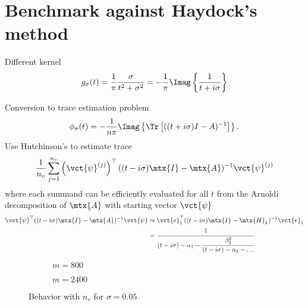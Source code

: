 
\section{Benchmark against Haydock's method}
\label{sec:5-experiments-haydock-method}

Different kernel
\begin{equation}
    g_{\sigma}(t) = \frac{1}{\pi} \frac{\sigma}{t^2 + \sigma^2} = -\frac{1}{\pi} \Imag\left\{ \frac{1}{t + i\sigma} \right\}
    \label{equ:5-experiments-cauchy-kernel}
\end{equation}

Conversion to trace estimation problem
\begin{equation}
    \phi_{\sigma}(t) = - \frac{1}{n \pi} \Imag \left\{ \Tr\left[((t + i\sigma)I - A)^{-1}\right]  \right\}.
    \label{equ:5-experiments-haydock-trace}
\end{equation}
Use Hutchinson's to estimate trace
\begin{equation}
    \frac{1}{n_v} \sum_{j=1}^{n_v} \left( \vct{\psi}^{(j)} \right)^{\top} ((t - i\sigma)\mtx{I} - \mtx{A})^{-1} \vct{\psi}^{(j)}
    \label{equ:5-experiments-haydock-hutchinson}
\end{equation}
where each summand can be efficiently evaluated for all $t$ from the Arnoldi decomposition of $\mtx{A}$ with starting vector $\vct{\psi}$
\begin{align}
    \vct{\psi}^{\top} ((t - i\sigma)\mtx{I} - \mtx{A})^{-1} \vct{\psi} &\approx \vct{e}_1^{\top} ((t - i\sigma)\mtx{I} - \mtx{H}_k)^{-1} \vct{e}_1 \notag \\
    &= \cfrac{1}{(t - i\sigma) - \alpha_1 - \cfrac{\beta_2^2}{(t - i\sigma) - \alpha_2 - \dots}}
    \label{equ:5-experiments-haydock-recursion}
\end{align}

\clearpage
\begin{figure}[ht]
    \begin{subfigure}[b]{0.45\columnwidth}
        
        \caption{$m=800$}
        \label{fig:5-experiments-haydock-convergence-nv-m800}
    \end{subfigure}
    \begin{subfigure}[b]{0.5\columnwidth}
        
        \caption{$m=2400$}
        \label{fig:5-experiments-haydock-convergence-nv-m2400}
    \end{subfigure}
    \caption{Behavior with $n_v$ for $\sigma=0.05$}
    \label{fig:5-experiments-haydock-convergence-nv}
\end{figure}


